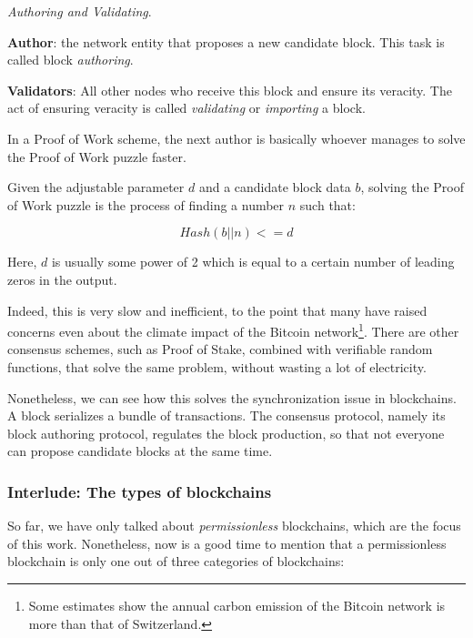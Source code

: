 \begin{definition} \label{def:auhtor_validator}

	\textit{Authoring and Validating}.

	\textbf{Author}: the network entity that proposes a new candidate block. This task is
	called block \textit{authoring}.

	\textbf{Validators}: All other nodes who receive this block and ensure its veracity. The act of
	ensuring veracity is called \textit{validating} or \textit{importing} a block.
\end{definition}

In a Proof of Work scheme, the next author is basically whoever manages to solve the Proof of Work
puzzle faster.

\begin{definition} \label{def:pow} Given the adjustable parameter $d$ and a candidate block data $b$,
solving the Proof of Work puzzle is the process of finding a number $n$ such that:

	\begin{equation}
		Hash(b || n) <= d
	\end{equation}

Here, $d$ is usually some power of 2 which is equal to a certain number of leading zeros in the output.
\end{definition}

Indeed, this is very slow and inefficient, to the point that many have raised concerns even about
the climate impact of the Bitcoin network\footnote{Some estimates show the annual carbon emission of
the Bitcoin network is more than that of Switzerland\cite{stollCarbonFootprintBitcoin2019}.}. There
are other consensus schemes, such as Proof of Stake, combined with verifiable random functions, that
solve the same problem, without wasting a lot of electricity.

Nonetheless, we can see how this solves the synchronization issue in blockchains. A block serializes
a bundle of transactions. The consensus protocol, namely its block authoring protocol, regulates the
block production, so that not everyone can propose candidate blocks at the same time.

\subsubsection{Interlude: The types of blockchains}

So far, we have only talked about \textit{permissionless} blockchains, which are the focus of this work. Nonetheless, now is a good time to mention that a
permissionless blockchain is only one out of three categories of blockchains:

